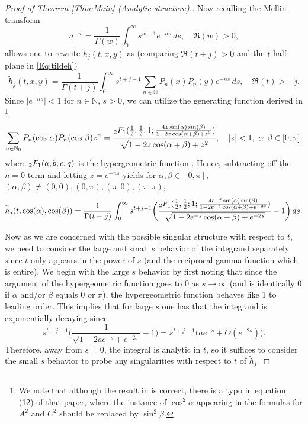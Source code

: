 \documentclass[letterpaper,10pt]{amsart}
\newcommand{\N}{\mathbb N}
\numberwithin{equation}{section}
\begin{document}
\begin{proof}[Proof of Theorem \ref{Thm:Main} (Analytic structure).]
Now recalling the Mellin transform
\begin{equation}
n^{-w}=\frac{1}{\Gamma(w)}\int_0^\infty s^{w-1}e^{-ns}\, ds,\quad \Re(w)>0,
\end{equation}
allows one to rewrite $\widetilde{h}_j(t,x,y)$ as (comparing $\Re(t+j)>0$ and the $t$ half-plane in \eqref{Eq:tildeh})
\begin{equation}
\widetilde{h}_j(t,x,y)=\frac{1}{\Gamma(t+j)}\int_0^\infty s^{t+j-1}\sum_{n\in \N} P_n(x)P_n(y) e^{-ns}\, ds,\quad \Re(t)>-j.
\end{equation}
Since $|e^{-ns}|<1$ for $n\in\mathbb{N}$, $s>0$, we can utilize the generating function derived in \cite{Max56}\footnote{We note that although the result in \cite{Max56} is correct, there is a typo in equation (12) of that paper, where the instance of $\cos^2\alpha$ appearing in the formulas for $A^2$ and $C^2$ should be replaced by $\sin^2\beta$.}:
\begin{equation}
\sum_{n\in\mathbb{N}_0}P_n(\cos\, \alpha) P_n(\cos\, \beta) z^n=\frac{\mathstrut_2 F_1(\tfrac{1}{2},\tfrac{1}{2};1;\tfrac{4z\sin(\alpha) \sin(\beta)}{1-2z\cos(\alpha+\beta)+z^2})}{\sqrt{1-2z\cos(\alpha+\beta)+z^2}},\quad |z|<1,\ \alpha,\beta\in[0,\pi],
\end{equation}
where $\mathstrut_2 F_1(a,b;c;q)$ is the hypergeometric function \cite[Sect. 15]{DLMF}. Hence, subtracting off the $n=0$ term and letting $z=e^{-ns}$ yields for $\alpha,\beta\in[0,\pi]$, $(\alpha,\beta)\neq(0,0),(0,\pi),(\pi,0),(\pi,\pi)$,
\begin{equation}\label{Eq:hint}
\widetilde{h}_j(t,\cos(\alpha),\cos(\beta))=\frac{1}{\Gamma(t+j)}\int_0^\infty s^{t+j-1}\bigg(\frac{\mathstrut_2 F_1(\tfrac{1}{2},\tfrac{1}{2};1;\tfrac{4e^{-s}\sin(\alpha) \sin(\beta)}{1-2e^{-s}\cos(\alpha+\beta)+e^{-2s}})}{\sqrt{1-2e^{-s}\cos(\alpha+\beta)+e^{-2s}}}-1\bigg)\, ds.
\end{equation}

Now as we are concerned with the possible singular structure with respect to $t$, we need to consider the large and small $s$ behavior of the integrand separately since $t$ only appears in the power of $s$ (and the reciprocal gamma function which is entire). We begin with the large $s$ behavior by first noting that since the argument of the hypergeometric function goes to 0 as $s\to\infty$ (and is identically $0$ if $\alpha$ and/or $\beta$ equals $0$ or $\pi$), the hypergeometric function behaves like 1 to leading order.
This implies that for large $s$ one has that the integrand is exponentially decaying since
\begin{equation}
s^{t+j-1}\bigg(\frac{1}{\sqrt{1-2a e^{-s}+e^{-2s}}}-1\bigg)=s^{t+j-1}\big(ae^{-s}+O(e^{-2s})\big).
\end{equation}
Therefore, away from $s=0$, the integral is analytic in $t$, so it suffices to consider the small $s$ behavior to probe any singularities with respect to $t$ of $\widetilde{h}_j$. 


\end{proof}
\end{document}
